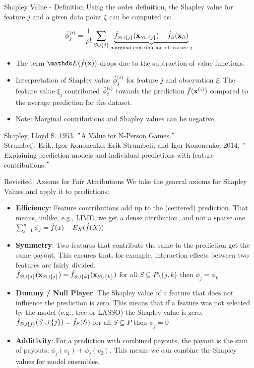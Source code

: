 \documentclass[11pt,compress,t,notes=noshow, aspectratio=169, xcolor=table]{beamer}
\begin{document}
\begin{vbframe}{Shapley Value - Definition}
  Using the order definition, the Shapley value for feature $j$ and a given data point $\xi$ can be computed as:

     $$ \phiij  = \frac{1}{p!} \sum_{\Scupj} \underbrace{\fh_{\Scupj}(\xv_{\Scupj}) - \fh_{S}(\xv_{S})}_{\text{marginal contribution of feature $j$}} $$
\begin{itemize}
    \item The term $\E(\fh(\xv))$ drops due to the subtraction of value functions.
  \item Interpretation of Shapley value $\phiij$ for feature $j$ and observation $\xi$:
  The feature value $\xi_j$ contributed $\phiij$ towards the prediction $\fh(\xi)$ compared to the average prediction for the dataset.
   \item Note: Marginal contributions and Shapley values can be negative.
\end{itemize}
\lz
\tiny
Shapley, Lloyd S. 1953. $"$A Value for N-Person Games.$"$\\
\vspace{0.2cm}
Strumbelj, Erik, Igor Kononenko, Erik Strumbelj, and Igor Kononenko. 2014. $"$Explaining prediction models and individual predictions with feature contributions.$"$

\end{vbframe}



\begin{vbframe}{Revisited: Axioms for Fair Attributions}
  We take the general axioms for Shapley Values and apply it to predictions:
  \vspace{0.25cm}
  \begin{itemize}
  \itemsep1em
    \item \textbf{Efficiency}: Feature contributions add up to the (centered) prediction. That means, unlike, e.g., LIME, we get a dense attribution, and not a sparse one.
      $\sum\nolimits_{j=1}^p\phi_j=\hat{f}(x)-E_X(\fh(X))$
    \item \textbf{Symmetry}: Two features that contribute the same to the prediction get the same payout. This ensures that, for example, interaction effects between two features are fairly divided. \\
      $\fh_{S\cup\{j\}}(\xv_{\Scupj}) = \fh_{\Scupk}(\xv_{\Scupk})$ for all $S \subseteq P\setminus\{j,k\}$ then $\phi_j=\phi_k$
    \item \textbf{Dummy / Null Player}: The Shapley value of a feature that does not influence the prediction is zero. This means that if a feature was not selected by the model (e.g., tree or LASSO) the Shapley value is zero.  \\
      $\fh_{\Scupj}(\Scupj)=\fhS(S)$ for all $S \subseteq P$ then $\phi_j=0$
    \item \textbf{Additivity}:  For a prediction with combined payouts, the
      payout is the sum of payouts: $\phi_j(v_1) + \phi_j(v_2)$. This means we can combine the Shapley values for model ensembles.
  \end{itemize}
\end{vbframe}
\end{document}
